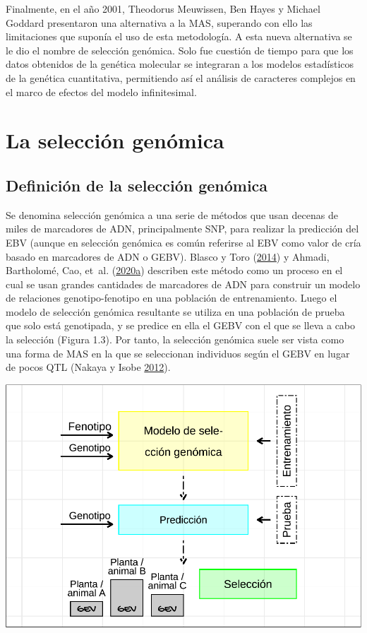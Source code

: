 \documentclass[11pt,spanish,a4paper,oneside,]{book} %
\begin{document}
Finalmente, en el año 2001, Theodorus Meuwissen, Ben Hayes y Michael Goddard presentaron una alternativa a la MAS, superando con ello las limitaciones que suponía el uso de esta metodología. A esta nueva alternativa se le dio el nombre de selección genómica. Solo fue cuestión de tiempo para que los datos obtenidos de la genética molecular se integraran a los modelos estadísticos de la genética cuantitativa, permitiendo así el análisis de caracteres complejos en el marco de efectos del modelo infinitesimal.

\hypertarget{la-selecciuxf3n-genuxf3mica}{%
\section{La selección genómica}\label{la-selecciuxf3n-genuxf3mica}}

\hypertarget{definiciuxf3n-de-la-selecciuxf3n-genuxf3mica}{%
\subsection{Definición de la selección genómica}\label{definiciuxf3n-de-la-selecciuxf3n-genuxf3mica}}

Se denomina selección genómica a una serie de métodos que usan decenas de miles de marcadores de ADN, principalmente SNP, para realizar la predicción del EBV (aunque en selección genómica es común referirse al EBV como valor de cría basado en marcadores de ADN o GEBV). Blasco y Toro (\protect\hyperlink{ref-cite:3}{2014}) y Ahmadi, Bartholomé, Cao, et~al. (\protect\hyperlink{ref-cite:33}{2020}\protect\hyperlink{ref-cite:33}{a}) describen este método como un proceso en el cual se usan grandes cantidades de marcadores de ADN para construir un modelo de relaciones genotipo-fenotipo en una población de entrenamiento. Luego el modelo de selección genómica resultante se utiliza en una población de prueba que solo está genotipada, y se predice en ella el GEBV con el que se lleva a cabo la selección (Figura 1.3). Por tanto, la selección genómica suele ser vista como una forma de MAS en la que se seleccionan individuos según el GEBV en lugar de pocos QTL (Nakaya y Isobe \protect\hyperlink{ref-cite:6}{2012}).

\begin{center}\includegraphics[width=1\linewidth]{figures/GS} \end{center}
\end{document}
